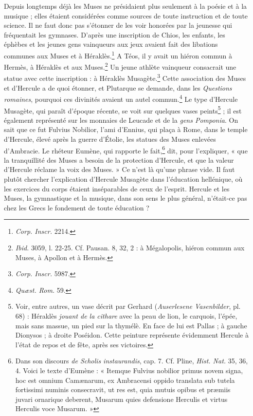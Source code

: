 \documentclass[landscape, a4paper, 11pt, oneside, polutonikogreek, french]{article}
\begin{document}
Depuis longtemps déjà les Muses ne présidaient plus seulement à la poésie et à la musique ; elles étaient considérées comme sources de toute instruction et de toute science. Il ne faut donc pas s'étonner de les voir honorées par la jeunesse qui fréquentait les gymnases. D'après une inscription de Chios, les enfants, les éphèbes et les jeunes gens vainqueurs aux jeux avaient fait des libations communes aux Muses et à Héraklès.\footnote{\emph{Corp. Inscr.} 2214.} A Téos, il y avait un hiéron commun à Hermès, à Héraklès et aux Muses.\footnote{\emph{Ibid.} 3059, l. 22-25. Cf. Pausan. 8, 32, 2 : à Mégalopolis, hiéron commun aux Muses, à Apollon et à Hermès.} Un jeune athlète vainqueur consacrait une statue avec cette inscription : à Héraklès Musagète.\footnote{\emph{Corp. Inscr.} 5987.} Cette association des Muses et d'Hercule a de quoi étonner, et Plutarque se demande, dans les \emph{Questions romaines}, pourquoi ces divinités avaient un autel commun.\footnote{\emph{Quæst. Rom.} 59.} Le type d'Hercule Musagète, qui paraît d'époque récente, se voit sur quelques vases peints\footnote{Voir, entre autres, un vase décrit par Gerhard (\emph{Auserlesene Vasenbilder}, pl. 68) : Héraklès \emph{jouant de la cithare} avec la peau de lion, le carquois, l'épée, mais sans massue, un pied sur la thymélè. En face de lui est Pallas ; à gauche Dionysos ; à droite Poséidon. Cette peinture représente évidemment Hercule à l'état de repos et de fête, après ses victoires.} ; il est également représenté sur les monnaies de Leucade et de la \emph{gens Pomponia}. On sait que ce fut Fulvius Nobilior, l'ami d'Ennius, qui plaça à Rome, dans le temple d'Hercule, élevé après la guerre d'Étolie, les statues des Muses enlevées d'Ambracie. Le rhéteur Eumène, qui rapporte le fait,\footnote{Dans son discours \emph{de Scholis instaurandis}, cap. 7. Cf. Pline, \emph{Hist. Nat.} 35, 36, 4. Voici le texte d'Eumène : « Itemque Fulvius nobilior primus novem signa, hoc est omnium Camænarum, ex Ambracensi oppido translata sub tutela fortissimi numinis consecravit, ut res est, quia mutuis opibus et præmiis juvari ornarique deberent, Musarum quies defensione Herculis et virtus Herculis voce Musarum. »} dit, pour l'expliquer, « que la tranquillité des Muses a besoin de la protection d'Hercule, et que la valeur d'Hercule réclame la voix des Muses. » Ce n'est là qu'une phrase vide. Il faut plutôt chercher l'explication d'Hercule Musagète dans l'éducation hellénique, où les exercices du corps étaient inséparables de ceux de l'esprit. Hercule et les Muses, la gymnastique et la musique, dans son sens le plus général, n'était-ce pas chez les Grecs le fondement de toute éducation ?
\end{document}
